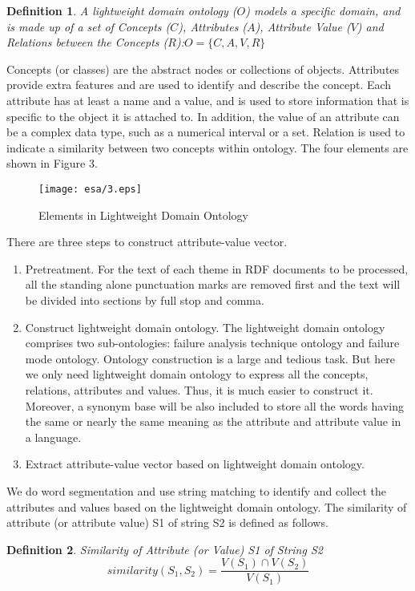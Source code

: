 \documentclass{elsarticle}
\newtheorem{definition}{Definition}
\begin{document}
\begin{definition}
  A lightweight domain ontology ($O$) models a specific domain, and is
  made up of a set of Concepts ($C$), Attributes ($A$), Attribute
  Value ($V$) and Relations between the Concepts ($R$):$O = \{C,A,V,R\}$


\end{definition}

Concepts (or classes) are the abstract nodes or collections of objects. Attributes provide extra features and are used to identify and describe the concept. Each attribute has at least a name and a value, and is used to store information that is specific to the object it is attached to. In addition, the value of an attribute can be a complex data type, such as a numerical interval or a set. Relation is used to indicate a similarity between two concepts within ontology. The four elements are shown in Figure 3.
\begin{figure}[htb]
  \centering
  \texttt{[image: esa/3.eps]}
  \caption{Elements in Lightweight Domain Ontology}
\end{figure}
There are three steps to construct attribute-value vector.
\begin{enumerate}
\item Pretreatment. For the text of each theme in RDF documents to be processed, all the standing alone punctuation marks are removed first and the text will be divided into sections by full stop and comma.
\item  Construct lightweight domain ontology. The lightweight domain ontology comprises two sub-ontologies: failure analysis technique ontology and failure mode ontology. Ontology construction is a large and tedious task. But here we only need lightweight domain ontology to express all the concepts, relations, attributes and values. Thus, it is much easier to construct it. Moreover, a synonym base will be also included to store all the words having the same or nearly the same meaning as the attribute and attribute value in a language. 
\item Extract attribute-value vector based on lightweight domain ontology.

\end{enumerate}

We do word segmentation and use string matching to identify and collect the attributes and values based on the lightweight domain ontology. The similarity of attribute (or attribute value) S1 of string S2 is defined as follows.
\begin{definition}
  Similarity of Attribute (or Value) S1 of String
  S2 \[similarity(S_1,S_2) = \frac{V(S_1) \cap V(S_2)}{V(S_1)} \]

\end{definition}
\end{document}
